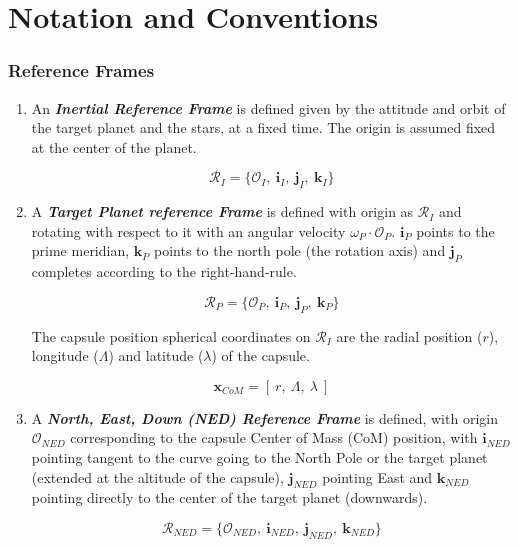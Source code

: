 \newpage
\chapter{Notation and Conventions}

\subsection{Reference Frames}

   \begin{enumerate}
      \item An \textbf{\textit{Inertial Reference Frame}} is defined given by the attitude and orbit of the target planet
         and the stars, at a fixed time.
         The origin is assumed fixed at the center of the planet.

         $$\mathcal{R}_{I}=\{ \mathcal{O}_{I},\: \textbf{i}_{I},\:\textbf{j}_I,\: \textbf{k}_I \}$$

      \item A \textbf{\textit{Target Planet reference Frame}} is defined with 
         origin as $\mathcal{R}_{I}$ and rotating with respect to it with an angular
         velocity $\omega_{P}\cdot \mathcal{O}_{P}$.
         $\textbf{i}_{P}$ points to the prime meridian, $\textbf{k}_{P}$ points to the
         north pole (the rotation axis) and $\textbf{j}_{P}$ completes according
         to the right-hand-rule.

         $$\mathcal{R}_{P}=\{ \mathcal{O}_{P},\: \textbf{i}_{P},\:\textbf{j}_P,\: \textbf{k}_P \}$$

         The capsule position spherical coordinates on $\mathcal{R}_{I}$ are the radial position
         ($r$), longitude ($\Lambda$) and latitude ($\lambda$) of the capsule.
      
         $$
            \textbf{x}_{CoM} = [\: r,\:\Lambda,\:\lambda \:]
         $$

      \item A \textbf{\textit{North, East, Down (NED) Reference Frame}} is defined, with origin $\mathcal{O}_{NED}$
         corresponding to the capsule Center of Mass (CoM) position, with $\textbf{i}_{NED}$
         pointing tangent to the curve going to the North Pole or the target planet (extended at
         the altitude of the capsule), $\textbf{j}_{NED}$ pointing East and $\textbf{k}_{NED}$
         pointing directly to the center of the target planet (downwards).

         $$\mathcal{R}_{NED}=\{ \mathcal{O}_{NED},\: \textbf{i}_{NED},\:\textbf{j}_{NED},\: \textbf{k}_{NED} \}$$


\end{enumerate}
